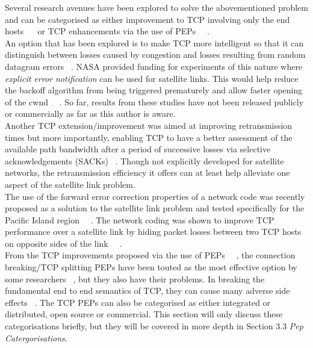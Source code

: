 Several research avenues have been explored to solve the abovementioned problem and can be categorised as either improvement to TCP involving only the end hosts ~\cite{10}~\cite{26} or TCP enhancements via the use of PEPs ~\cite{6}~\cite{14}. \\

An option that has been explored is to make TCP more intelligent so that it can distinguish between losses caused by congestion and losses resulting from random datagram errors ~\cite{23}. NASA provided funding for experiments of this nature where \emph{explicit error notification} can be used for satellite links. This would help reduce the backoff algorithm from being triggered prematurely and allow faster opening of the cwnd ~\cite{13}~\cite{23}. So far, results from these studies have not been released publicly or commercially as far as this author is aware. \\

Another TCP extension/improvement was aimed at improving retransmission times but more importantly, enabling TCP to have a better assessment of the available path bandwidth after a period of successive losses via selective acknowledgements (SACKs) ~\cite{24}. Though not explicitly developed for satellite networks, the retransmission efficiency it offers can at least help alleviate one aspect of the satellite link problem.\\

The use of the forward error correction properties of a network code was recently proposed as a solution to the satellite link problem and tested specifically for the Pacific Island region ~\cite{4}~\cite{5}. The network coding was shown to improve TCP performance over a satellite link by hiding packet losses between two TCP hosts on opposite sides of the link ~\cite{4}~\cite{5}.\\

From the TCP improvements proposed via the use of PEPs ~\cite{6}~\cite{14}, the connection breaking/TCP splitting PEPs have been touted as the most effective option by some researchers ~\cite{14}, but they also have their problems. In breaking the fundamental end to end semantics of TCP, they can cause many adverse side effects ~\cite{6}. The TCP PEPs can also be categorised as either integrated or distributed, open source or commercial. This section will only discuss these categorisations briefly, but they will be covered in more depth in Section 3.3 \emph{Pep Catergorisations}.\\

